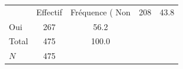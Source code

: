 {
\def\sym#1{\ifmmode^{#1}\else\(^{#1}\)\fi}
\begin{tabular}{l*{1}{cc}}
\toprule
            &    Effectif&Fréquence (%
\midrule
Non         &         208&        43.8\\
Oui         &         267&        56.2\\
Total       &         475&       100.0\\
\midrule
\(N\)       &         475&            \\
\bottomrule
\end{tabular}
}
